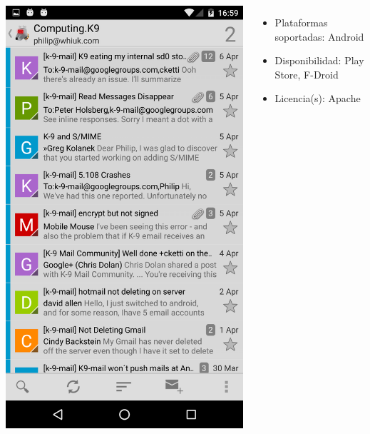 \begin{frame}
\begin{columns}[c]
\begin{center}
                \includegraphics[height=0.5\textheight]{images/k9-screencap.png}
            \end{center}
            \begin{itemize}
                \item Plataformas soportadas: Android
                \item Disponibilidad: Play Store, F-Droid
                \item Licencia(s): Apache
            \end{itemize}
    \end{columns}

\end{frame}

